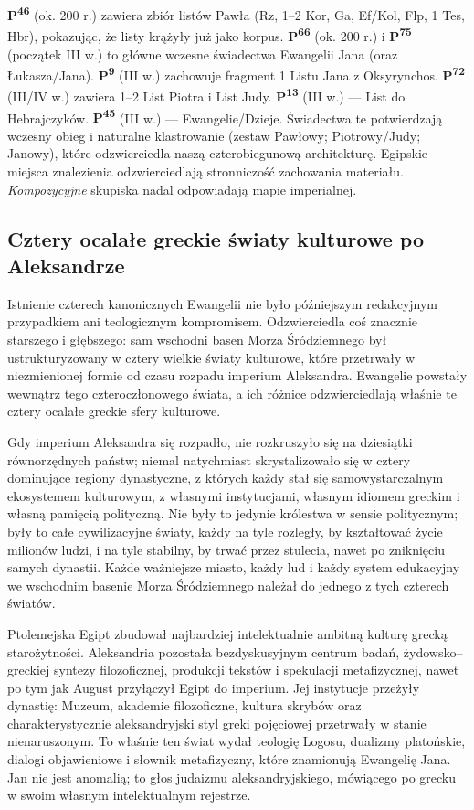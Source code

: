 \textbf{P\textsuperscript{46}} (ok. 200 r.) zawiera zbiór listów Pawła (Rz, 1–2 Kor, Ga, Ef/Kol, Flp, 1 Tes, Hbr), pokazując, że listy krążyły już jako korpus.
\textbf{P\textsuperscript{66}} (ok. 200 r.) i \textbf{P\textsuperscript{75}} (początek III w.) to główne wczesne świadectwa Ewangelii Jana (oraz Łukasza/Jana).
\textbf{P\textsuperscript{9}} (III w.) zachowuje fragment 1 Listu Jana z Oksyrynchos.
\textbf{P\textsuperscript{72}} (III/IV w.) zawiera 1–2 List Piotra i List Judy.
\textbf{P\textsuperscript{13}} (III w.) — List do Hebrajczyków.
\textbf{P\textsuperscript{45}} (III w.) — Ewangelie/Dzieje.
Świadectwa te potwierdzają wczesny obieg i naturalne klastrowanie (zestaw Pawłowy; Piotrowy/Judy; Janowy), które odzwierciedla naszą czterobiegunową architekturę.
Egipskie miejsca znalezienia odzwierciedlają stronniczość zachowania materiału.
\emph{Kompozycyjne} skupiska nadal odpowiadają mapie imperialnej.

\subsection{Cztery ocalałe greckie światy kulturowe po Aleksandrze}

Istnienie czterech kanonicznych Ewangelii nie było późniejszym redakcyjnym przypadkiem ani teologicznym kompromisem.
Odzwierciedla coś znacznie starszego i głębszego: sam wschodni basen Morza Śródziemnego był ustrukturyzowany w cztery wielkie światy kulturowe, które przetrwały w niezmienionej formie od czasu rozpadu imperium Aleksandra.
Ewangelie powstały wewnątrz tego czteroczłonowego świata, a ich różnice odzwierciedlają właśnie te cztery ocalałe greckie sfery kulturowe.

Gdy imperium Aleksandra się rozpadło, nie rozkruszyło się na dziesiątki równorzędnych państw; niemal natychmiast skrystalizowało się w cztery dominujące regiony dynastyczne, z których każdy stał się samowystarczalnym ekosystemem kulturowym, z własnymi instytucjami, własnym idiomem greckim i własną pamięcią polityczną.
Nie były to jedynie królestwa w sensie politycznym; były to całe cywilizacyjne światy, każdy na tyle rozległy, by kształtować życie milionów ludzi, i na tyle stabilny, by trwać przez stulecia, nawet po zniknięciu samych dynastii.
Każde ważniejsze miasto, każdy lud i każdy system edukacyjny we wschodnim basenie Morza Śródziemnego należał do jednego z tych czterech światów.

Ptolemejska Egipt zbudował najbardziej intelektualnie ambitną kulturę grecką starożytności.
Aleksandria pozostała bezdyskusyjnym centrum badań, żydowsko–greckiej syntezy filozoficznej, produkcji tekstów i spekulacji metafizycznej, nawet po tym jak August przyłączył Egipt do imperium.
Jej instytucje przeżyły dynastię: Muzeum, akademie filozoficzne, kultura skrybów oraz charakterystycznie aleksandryjski styl greki pojęciowej przetrwały w stanie nienaruszonym.
To właśnie ten świat wydał teologię Logosu, dualizmy platońskie, dialogi objawieniowe i słownik metafizyczny, które znamionują Ewangelię Jana.
Jan nie jest anomalią; to głos judaizmu aleksandryjskiego, mówiącego po grecku w swoim własnym intelektualnym rejestrze.

